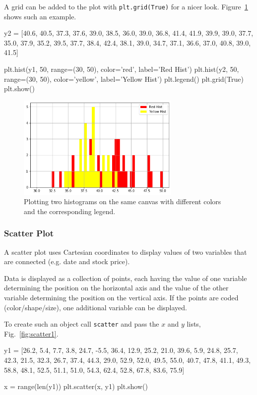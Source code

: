 A grid can be added to the plot with \texttt{plt.grid(True)} for a nicer look. Figure~\ref{fig:histo3} shows such an example.

\begin{ipython}
y2 = [40.6, 40.5, 37.3, 37.6, 39.0, 38.5, 36.0, 
      39.0, 36.8, 41.4, 41.9, 39.9, 39.0, 37.7, 
      35.0, 37.9, 35.2, 39.5, 37.7, 38.4, 42.4, 
      38.1, 39.0, 34.7, 37.1, 36.6, 37.0, 40.8, 
      39.0, 41.5]

plt.hist(y1, 50, range=(30, 50), color='red', label='Red Hist')
plt.hist(y2, 50, range=(30, 50), color='yellow', label='Yellow Hist')
plt.legend()
plt.grid(True)
plt.show()
\end{ipython}

\begin{figure}[htb]
	\centering
	\includegraphics[width=0.7\textwidth]{figures/histo3}
	\caption{Plotting two histograms on the same canvas with different colors and the 
		corresponding legend.}
	\label{fig:histo3}
\end{figure}

\subsubsection{Scatter Plot}\label{scatter}

A scatter plot uses Cartesian coordinates to display values of two variables that are connected (e.g. date and stock price). 

Data is displayed as a collection of points, each having the value of one variable determining the position on the horizontal axis and the value of the other variable determining the position on the vertical axis. If the points are coded (color/shape/size), one additional variable can be displayed.

To create such an object call \texttt{scatter} and pass the \(x\) and \(y\) lists, Fig.~\ref{fig:scatter1}.

\begin{ipython}
y1 = [26.2, 5.4, 7.7, 3.8, 24.7, -5.5, 36.4, 12.9, 25.2, 21.0, 39.6,
      5.9, 24.8, 25.7, 42.3, 21.5, 32.3, 26.7, 37.4, 44.3, 29.0,
      52.9, 52.0, 49.5, 55.0, 40.7, 47.8, 41.1, 49.3, 58.8, 48.1,
      52.5, 51.1, 51.0, 54.3, 62.4, 52.8, 67.8, 83.6, 75.9]

x = range(len(y1))
plt.scatter(x, y1)
plt.show()
\end{ipython}

